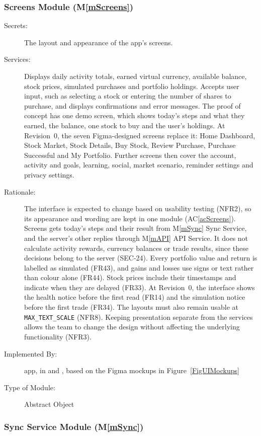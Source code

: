 \documentclass[12pt, titlepage]{article}
\newcommand{\acref}[1]{AC\ref{#1}}
\newcommand{\mref}[1]{M\ref{#1}}
\begin{document}
\subsubsection{Screens Module (\mref{mScreens})}
\begin{description}
\item[Secrets:] The layout and appearance of the app's screens.
\item[Services:] Displays daily activity totals, earned virtual currency, available balance, stock prices, simulated purchases and portfolio holdings. Accepts user input, such as selecting a stock or entering the number of shares to purchase, and displays confirmations and error messages. The proof of concept has one demo screen, which shows today's steps and what they earned, the balance, one stock to buy and the user's holdings. At Revision~0, the seven Figma-designed screens replace it: Home Dashboard, Stock Market, Stock Details, Buy Stock, Review Purchase, Purchase Successful and My Portfolio. Further screens then cover the account, activity and goals, learning, social, market scenario, reminder settings and privacy settings.
\item[Rationale:] The interface is expected to change based on usability testing (NFR2), so its appearance and wording are kept in one module (\acref{acScreens}). Screens gets today's steps and their result from \mref{mSync} Sync Service, and the server's other replies through \mref{mAPI} API Service. It does not calculate activity rewards, currency balances or trade results, since these decisions belong to the server (SEC-24). Every portfolio value and return is labelled as simulated (FR43), and gains and losses use signs or text rather than colour alone (FR44). Stock prices include their timestamps and indicate when they are delayed (FR33). At Revision~0, the interface shows the health notice before the first read (FR14) and the simulation notice before the first trade (FR34). The layouts must also remain usable at \texttt{MAX\_TEXT\_SCALE} (NFR8). Keeping presentation separate from the services allows the team to change the design without affecting the underlying functionality (NFR3).
\item[Implemented By:] \progname{} app, in  and , based on the Figma mockups in Figure~\ref{FigUIMockups}
\item[Type of Module:] Abstract Object
\end{description}

\subsubsection{Sync Service Module (\mref{mSync})}
\end{document}

